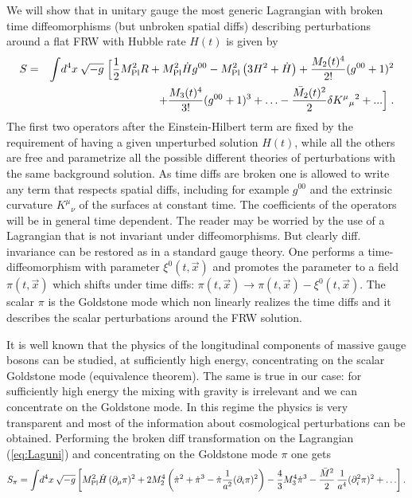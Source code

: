 \documentclass[12pt,letterpaper]{article}
\newcommand{\di}{\partial}
\begin{document}
{We will show that in unitary gauge the most generic Lagrangian with broken time diffeomorphisms (but unbroken spatial diffs)  describing perturbations around a flat FRW with Hubble rate $H(t)$ is given by
\begin{eqnarray}
\label{eq:Laguni}
S & = & \int  \! d^4 x  \: \sqrt{- g} \;\Big[\frac12 M_{\rm Pl}^2 R+
M_{\rm Pl}^2 \dot{H} g^{00} -  M_{\rm Pl}^2 \left(3
H^2+\dot{H}\right) + \frac{M_2(t)^4}{2!} (g^{00}+1)^2 \\ & & \nonumber + \frac{M_3(t)^4}{3!} (g^{00}+1)^3 + \ldots
-\frac{\bar{M_2}(t)^2}{2}\delta K^\mu {}_\mu {}^2 +... \Big] \; .
\end{eqnarray}
The first two operators after the Einstein-Hilbert term are fixed by
the requirement of having a given unperturbed solution $H(t)$, while
all the others are free and parametrize all the possible different
theories of perturbations with the same background solution. As time diffs are broken one is allowed to write any term that respects spatial diffs, including for example $g^{00}$ and the extrinsic curvature $K^\mu {}_\nu {}$ of the surfaces at constant time. The coefficients of the operators will be in general time dependent.
The reader may be worried by the use of a Lagrangian that is not invariant under diffeomorphisms. But clearly diff. invariance can be restored as in a standard gauge theory. One performs a time-diffeomorphism with parameter $\xi^0(t,\vec x)$ and promotes the parameter to a field $\pi(t, \vec x)$ which shifts under time diffs:
$\pi(t,\vec{x})\rightarrow \pi(t,\vec{x})-\xi^0(t,\vec{x})$. The
scalar $\pi$ is the Goldstone mode which non linearly realizes the time diffs and it describes the scalar perturbations around the FRW solution. 

It is well known that the physics of the longitudinal components of massive gauge bosons can be studied, at sufficiently high energy, concentrating on the scalar Goldstone mode (equivalence theorem). The same is true in our case: for sufficiently high energy the mixing with gravity is irrelevant and we can concentrate on the Goldstone mode. In this regime the physics is very transparent and most of the information about cosmological perturbations can be obtained. Performing the broken diff transformation on the Lagrangian (\ref{eq:Laguni}) and concentrating on the Goldstone mode $\pi$ one gets
\begin{eqnarray} \label{theeffectiveaction} S_\pi = \int \! d^4 x \:
\sqrt{-g}\left[ M_{\rm Pl}^2 \dot H
 \, (\partial_\mu \pi)^2+2 M^4_2\left(\dot\pi^2+ \dot\pi^3-\dot\pi \frac{1}{a^2}(\di_i\pi)^2\right)-\frac{ 4}{3} M^4_3 \dot\pi^3 - \frac{\bar M ^2}{2} \,
\frac{1}{a^4}(\di_i ^2 \pi)^2 +\ldots
\right].
 \end{eqnarray}

}
\end{document}
